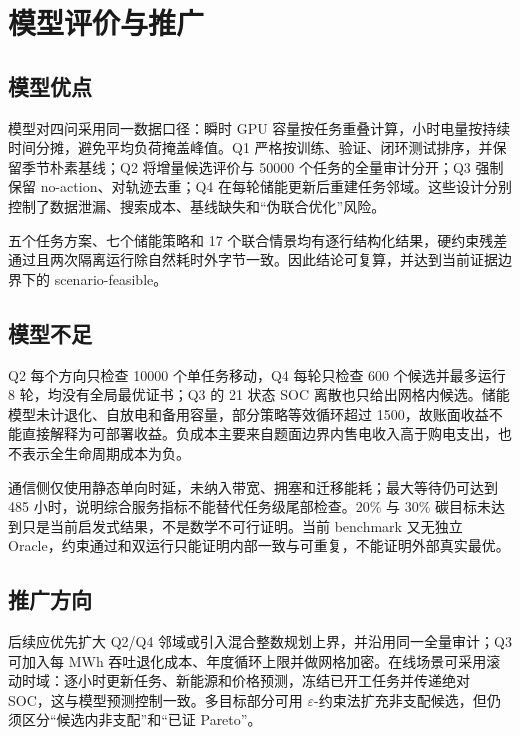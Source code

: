 \section{模型评价与推广}
\subsection{模型优点}
模型对四问采用同一数据口径：瞬时 GPU 容量按任务重叠计算，小时电量按持续时间分摊，避免平均负荷掩盖峰值。Q1 严格按训练、验证、闭环测试排序，并保留季节朴素基线；Q2 将增量候选评价与 50000 个任务的全量审计分开；Q3 强制保留 no-action、对轨迹去重；Q4 在每轮储能更新后重建任务邻域。这些设计分别控制了数据泄漏、搜索成本、基线缺失和“伪联合优化”风险。

五个任务方案、七个储能策略和 17 个联合情景均有逐行结构化结果，硬约束残差通过且两次隔离运行除自然耗时外字节一致。因此结论可复算，并达到当前证据边界下的 scenario-feasible。

\subsection{模型不足}
Q2 每个方向只检查 10000 个单任务移动，Q4 每轮只检查 600 个候选并最多运行 8 轮，均没有全局最优证书；Q3 的 21 状态 SOC 离散也只给出网格内候选。储能模型未计退化、自放电和备用容量，部分策略等效循环超过 1500，故账面收益不能直接解释为可部署收益。负成本主要来自题面边界内售电收入高于购电支出，也不表示全生命周期成本为负。

通信侧仅使用静态单向时延，未纳入带宽、拥塞和迁移能耗；最大等待仍可达到 485 小时，说明综合服务指标不能替代任务级尾部检查。20\% 与 30\% 碳目标未达到只是当前启发式结果，不是数学不可行证明。当前 benchmark 又无独立 Oracle，约束通过和双运行只能证明内部一致与可重复，不能证明外部真实最优。

\subsection{推广方向}
后续应优先扩大 Q2/Q4 邻域或引入混合整数规划上界，并沿用同一全量审计；Q3 可加入每 MWh 吞吐退化成本、年度循环上限并做网格加密。在线场景可采用滚动时域：逐小时更新任务、新能源和价格预测，冻结已开工任务并传递绝对 SOC，这与模型预测控制一致\cite{rawlings2017model}。多目标部分可用 $\varepsilon$-约束法扩充非支配候选\cite{miettinen1999nonlinear}，但仍须区分“候选内非支配”和“已证 Pareto”。
